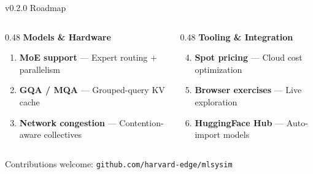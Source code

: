 \documentclass[aspectratio=169, 12pt]{beamer}
\begin{document}
\begin{frame}{v0.2.0 Roadmap}
\small
\begin{columns}[T]
\begin{column}{0.48\textwidth}
\textbf{Models \& Hardware}
\begin{enumerate}
  \item \textbf{MoE support} --- Expert routing + parallelism
  \item \textbf{GQA / MQA} --- Grouped-query KV cache
  \item \textbf{Network congestion} --- Contention-aware collectives
\end{enumerate}
\end{column}
\begin{column}{0.48\textwidth}
\textbf{Tooling \& Integration}
\begin{enumerate}\setcounter{enumi}{3}
  \item \textbf{Spot pricing} --- Cloud cost optimization
  \item \textbf{Browser exercises} --- Live exploration
  \item \textbf{HuggingFace Hub} --- Auto-import models
\end{enumerate}
\end{column}
\end{columns}

\vspace{0.5em}
\begin{center}
Contributions welcome: \texttt{github.com/harvard-edge/mlsysim}
\end{center}
\end{frame}
\end{document}

